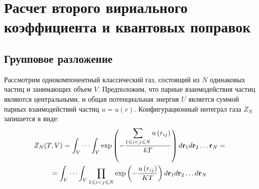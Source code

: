 \section{Расчет второго вириального коэффициента и квантовых поправок}

\subsection{Групповое разложение}

Рассмотрим однокомпонентный классический газ, состоящий из $N$ одинаковых частиц и занимающих объем $V$. Предположим, что парные взаимодействия частиц являются центральными, и общая потенциальная энергия $U$ является суммой парных взаимодействий частиц $u = u(r)$. Конфигурационный интеграл газа $Z_N$ запишется в виде:
\vverh
\begin{gather}
	Z_N (T, V) = \int_V \cdots \int_V \exp \left( - \frac{\displaystyle\sum_{1 \leqslant i < j \leqslant N} u \left( r_{ij} \right)}{kT} \right) d \mathbf{r}_1 d \mathbf{r}_2 \dots \mathbf{r}_N = \notag \\
	= \int_V \cdots \int_V \prod_{1 \leqslant i < j \leqslant N} \exp \left( - \frac{u \left( r_{ij} \right)}{KT} \right) d \mathbf{r}_1 d \mathbf{r}_2 \dots d \mathbf{r}_N \label{confint}
\end{gather}


